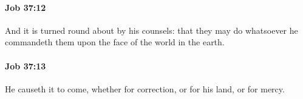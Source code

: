 		\paragraph{Job 37:12} %
			\label{JOB-37-12}

			And it is turned round about by his counsels: that they may do whatsoever he commandeth them upon the face of the world in the earth.


		\paragraph{Job 37:13} %
			\label{JOB-37-13}

			He causeth it to come, whether for correction, or for his land, or for mercy.


